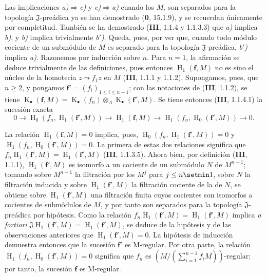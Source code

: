 Las implicaciones \emph{a)}$\Rightarrow$\emph{c)} y \emph{c)}$\Rightarrow$\emph{a)} cuando los $M_i$ son separados para la topología $\mathfrak J$-preádica ya se han demostrado (\textbf{0}, 15.1.9), y se recuerdan únicamente por completitud. También se ha demostrado (\textbf{III}, 1.1.4 y 1.1.3.3) que \emph{a)} implica \emph{b)}, y \emph{b)} implica trivialmente \emph{b$'$)}. Queda, pues, por ver que, cuando todo módulo cociente de un submódulo de $M$ es separado para la topología $\mathfrak J$-preádica, \emph{b$'$)} implica \emph{a)}. Razonemos por inducción sobre $n$. Para $n=1$, la afirmación se deduce trivialmente de las definiciones, pues entonces $\operatorname{H}_1(\mathbf f,M)$ no es sino el núcleo de la homotecia $z\leadsto f_1z$ en $M$ (\textbf{III}, 1.1.1 y 1.1.2). Supongamos, pues, que $n\geq2$, y pongamos $\mathbf f'=(f_i)_{1\leq i\leq n-1}$; con las notaciones de (\textbf{III}, 1.1.2), se tiene $\operatorname{K}_\bullet(\mathbf f,M)=\operatorname{K}_\bullet(f_n)\otimes_A\operatorname{K}_\bullet(\mathbf f',M)$. Se tiene entonces (\textbf{III}, 1.1.4.1) la sucesión exacta
\begin{equation}
  0\longrightarrow\operatorname{H}_0(f_n,\operatorname{H}_1(\mathbf f',M))\longrightarrow\operatorname{H}_1(\mathbf f,M)\longrightarrow\operatorname{H}_1(f_n,\operatorname{H}_0(\mathbf f',M))\longrightarrow0.
  \tag{19.5.1.1}\label{IV.19.5.1.1}
\end{equation}


La relación $\operatorname{H}_1(\mathbf f,M)=0$ implica, pues, $\operatorname{H}_0(f_n,\operatorname{H}_1(\mathbf f',M))=0$ y $\operatorname{H}_1(f_n,\operatorname{H}_0(\mathbf f',M))=0$. La primera de estas dos relaciones significa que $f_n\operatorname{H}_1(\mathbf f',M)=\operatorname{H}_1(\mathbf f',M)$ (\textbf{III}, 1.1.3.5). Ahora bien, por definición (\textbf{III}, 1.1.1), $\operatorname{H}_1(\mathbf f',M)$ es isomorfo a un cociente de un submódulo $N$ de $M^{n-1}$; tomando sobre $M^{n-1}$ la filtración por los $M^j$ para $j\leq n\setmin 1$, sobre $N$ la filtración inducida y sobre $\operatorname{H}_1(\mathbf f',M)$ la filtración cociente de la de $N$, se obtiene sobre $\operatorname{H}_1(\mathbf f',M)$ una filtración finita cuyos cocientes son isomorfos a cocientes de submódulos de $M$, y por tanto son separados para la topología $\mathfrak J$-preádica por hipótesis. Como la relación $f_n\operatorname{H}_1(\mathbf f',M)=\operatorname{H}_1(\mathbf f',M)$ implica \emph{a fortiori} $\mathfrak J\operatorname{H}_1(\mathbf f',M)=\operatorname{H}_1(\mathbf f',M)$, se deduce de la hipótesis y de las observaciones anteriores que $\operatorname{H}_1(\mathbf f',M)=0$. La hipótesis de inducción demuestra entonces que la sucesión $\mathbf f'$ es M-regular. Por otra parte, la relación $\operatorname{H}_1(f_n,\operatorname{H}_0(\mathbf f',M))=0$ significa que $f_n$ es $(M/(\sum_{i=1}^{n-1}f_iM))$-regular; por tanto, la sucesión $\mathbf f$ es M-regular.

